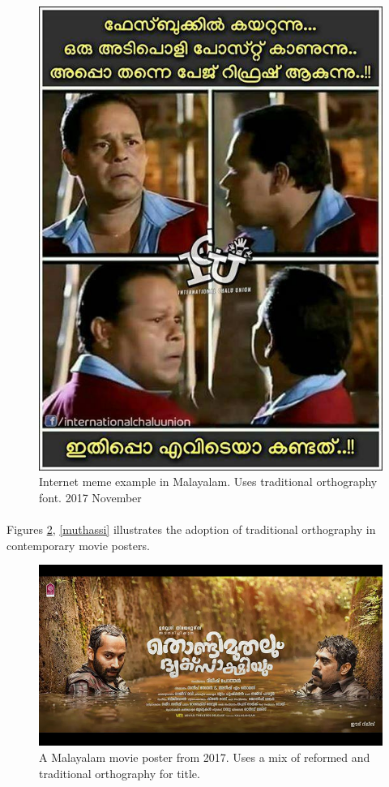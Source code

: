 \documentclass[10pt]{article}
\begin{document}
\begin{figure}[H]
	\centering
	\includegraphics[scale=0.4]{images/2017-icu-meme.jpg}
	\caption{Internet meme example in Malayalam. Uses traditional orthography font. 2017 November}
	\label{meme}
\end{figure}



\paragraph{}Figures  \ref{thondi}, \ref{muthassi} illustrates the adoption of traditional orthography in contemporary movie posters.

\begin{figure}[H]
 \centering
  \includegraphics[width=1.0\textwidth]{images/2017-movieposter-Thondimuthal}
 \caption{A Malayalam movie poster from 2017. Uses a mix of reformed and traditional orthography for title.}
 \label{thondi}
\end{figure}
\end{document}
